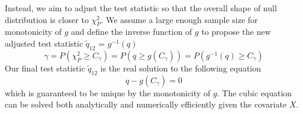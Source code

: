 \documentclass[aap, preprint]{imsart}
\numberwithin{equation}{section}
\theoremstyle{plain}
\begin{document}
\vspace{5mm} 
Instead, we aim to adjust the test statistic so that the overall shape of null distribution is closer to $\chi_{P}^2$. We assume a large enough sample size for monotonicity of $g$ and define the inverse function of $g$ to propose the new adjusted test statistic $\tilde{q}_{12}$ = $g^{-1}(q)$
$$\gamma = P(\chi_{P}^2 \geq C_{\gamma}) = P(q \geq g(C_{\gamma})) = P(g^{-1}(q) \geq C_{\gamma})$$
Our final test statistic $\tilde{q}_{12}$ is the real solution to the following equation 
$$q - g(C_{\gamma}) = 0$$
which is guaranteed to be unique by the monotonicity of $g$. The cubic equation can be solved both analytically and numerically efficiently given the covariate $X$. 
\end{document}
